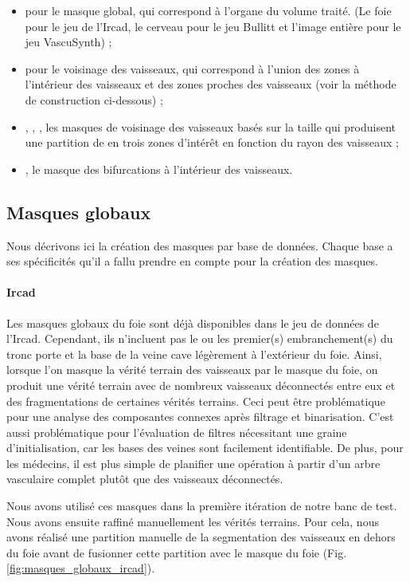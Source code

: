 \begin{itemize}
  \item \maskglobal pour le masque global, qui correspond à l'organe du volume traité. (Le foie pour le jeu de l'Ircad, le cerveau pour le jeu Bullitt et l'image entière pour le jeu VascuSynth) ;
  \item \maskvascular pour le voisinage des vaisseaux, qui correspond à l'union des zones à l'intérieur des vaisseaux et des zones proches des vaisseaux (voir la méthode de construction ci-dessous) ;
  \item \maskvesselLarge, \maskvesselMedium, \maskvesselSmall, les masques de voisinage des vaisseaux basés sur la taille  qui produisent une partition de \maskvascular en trois zones d'intérêt en fonction du rayon des vaisseaux ;
  \item \maskbif, le masque des bifurcations à l'intérieur des vaisseaux.
  \end{itemize}

\subsection{Masques globaux}

Nous décrivons ici la création des masques par base de données. Chaque base a ses spécificités qu'il a fallu prendre en compte pour la création des masques.

\paragraph{Ircad}
Les masques globaux du foie sont déjà disponibles dans le jeu de données de l'Ircad. Cependant, ils n'incluent pas le ou les premier(s) embranchement(s) du tronc porte et la base de la veine cave légèrement à l'extérieur du foie. Ainsi, lorsque l'on masque la vérité terrain des vaisseaux par le masque du foie, on produit une vérité terrain avec de nombreux vaisseaux déconnectés entre eux et des fragmentations de certaines vérités terrains. Ceci peut être problématique pour une analyse des composantes connexes après filtrage et binarisation. C'est aussi problématique pour l'évaluation de filtres nécessitant une graine d'initialisation, car les bases des veines sont facilement identifiable. De plus, pour les médecins, il est plus simple de planifier une opération à partir d'un arbre vasculaire complet plutôt que des vaisseaux déconnectés.

Nous avons utilisé ces masques dans la première itération de notre banc de test. Nous avons ensuite raffiné manuellement les vérités terrains. Pour cela, nous avons réalisé une partition manuelle de la segmentation des vaisseaux en dehors du foie avant de fusionner cette partition avec le masque du foie (Fig. \ref{fig:masques_globaux_ircad}).

